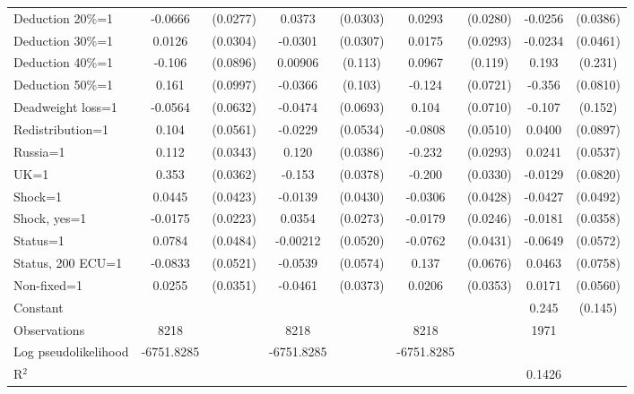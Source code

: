 \begin{tabular}{l|cccccc|cc}
Deduction 20\%=1&  -0.0666\sym{**} & (0.0277)&   0.0373         & (0.0303)&   0.0293         & (0.0280)&  -0.0256         & (0.0386)\\
Deduction 30\%=1&   0.0126         & (0.0304)&  -0.0301         & (0.0307)&   0.0175         & (0.0293)&  -0.0234         & (0.0461)\\
Deduction 40\%=1&   -0.106         & (0.0896)&  0.00906         &  (0.113)&   0.0967         &  (0.119)&    0.193         &  (0.231)\\
Deduction 50\%=1&    0.161         & (0.0997)&  -0.0366         &  (0.103)&   -0.124\sym{*}  & (0.0721)&   -0.356\sym{***}& (0.0810)\\
Deadweight loss=1&  -0.0564         & (0.0632)&  -0.0474         & (0.0693)&    0.104         & (0.0710)&   -0.107         &  (0.152)\\
Redistribution=1&    0.104\sym{*}  & (0.0561)&  -0.0229         & (0.0534)&  -0.0808         & (0.0510)&   0.0400         & (0.0897)\\
Russia=1        &    0.112\sym{***}& (0.0343)&    0.120\sym{***}& (0.0386)&   -0.232\sym{***}& (0.0293)&   0.0241         & (0.0537)\\
UK=1            &    0.353\sym{***}& (0.0362)&   -0.153\sym{***}& (0.0378)&   -0.200\sym{***}& (0.0330)&  -0.0129         & (0.0820)\\
Shock=1         &   0.0445         & (0.0423)&  -0.0139         & (0.0430)&  -0.0306         & (0.0428)&  -0.0427         & (0.0492)\\
Shock, yes=1    &  -0.0175         & (0.0223)&   0.0354         & (0.0273)&  -0.0179         & (0.0246)&  -0.0181         & (0.0358)\\
Status=1        &   0.0784         & (0.0484)& -0.00212         & (0.0520)&  -0.0762\sym{*}  & (0.0431)&  -0.0649         & (0.0572)\\
Status, 200 ECU=1&  -0.0833         & (0.0521)&  -0.0539         & (0.0574)&    0.137\sym{**} & (0.0676)&   0.0463         & (0.0758)\\
Non-fixed=1     &   0.0255         & (0.0351)&  -0.0461         & (0.0373)&   0.0206         & (0.0353)&   0.0171         & (0.0560)\\
Constant        &                  &         &                  &         &                  &         &    0.245\sym{*}  &  (0.145)\\
\hline
Observations    &     8218         &         &     8218         &         &     8218         &         &     1971         &         \\
Log pseudolikelihood  &  -6751.8285  &         &       -6751.8285            &         &    -6751.8285               &         &           &   \\ 
R$^2$      &                  &         &                  &         &                  &         &    0.1426       &   \\ 


\end{tabular}
